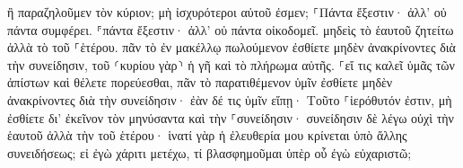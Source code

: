 \documentclass{openreader}
\begin{document}
ἢ παραζηλοῦμεν τὸν κύριον; μὴ ἰσχυρότεροι αὐτοῦ ἐσμεν; 
⸀Πάντα ἔξεστιν· ἀλλ’ οὐ πάντα συμφέρει. ⸁πάντα ἔξεστιν· ἀλλ’ οὐ πάντα οἰκοδομεῖ. 
μηδεὶς τὸ ἑαυτοῦ ζητείτω ἀλλὰ τὸ τοῦ ⸀ἑτέρου. 
πᾶν τὸ ἐν μακέλλῳ πωλούμενον ἐσθίετε μηδὲν ἀνακρίνοντες διὰ τὴν συνείδησιν, 
τοῦ ⸂κυρίου γὰρ⸃ ἡ γῆ καὶ τὸ πλήρωμα αὐτῆς. 
⸀εἴ τις καλεῖ ὑμᾶς τῶν ἀπίστων καὶ θέλετε πορεύεσθαι, πᾶν τὸ παρατιθέμενον ὑμῖν ἐσθίετε μηδὲν ἀνακρίνοντες διὰ τὴν συνείδησιν· 
ἐὰν δέ τις ὑμῖν εἴπῃ· Τοῦτο ⸀ἱερόθυτόν ἐστιν, μὴ ἐσθίετε δι’ ἐκεῖνον τὸν μηνύσαντα καὶ τὴν ⸀συνείδησιν· 
συνείδησιν δὲ λέγω οὐχὶ τὴν ἑαυτοῦ ἀλλὰ τὴν τοῦ ἑτέρου· ἱνατί γὰρ ἡ ἐλευθερία μου κρίνεται ὑπὸ ἄλλης συνειδήσεως; 
εἰ ἐγὼ χάριτι μετέχω, τί βλασφημοῦμαι ὑπὲρ οὗ ἐγὼ εὐχαριστῶ; 
\end{document}
